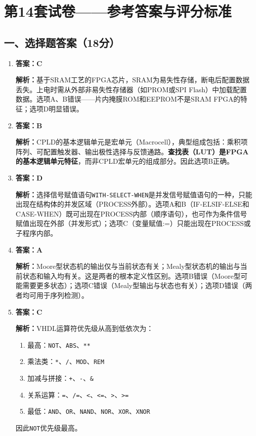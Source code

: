 \chapter{第14套试卷——参考答案与评分标准}

\section{一、选择题答案（18分）}

\begin{enumerate}[label=\arabic*.]

\item \textbf{答案：C}

\textbf{解析：}基于SRAM工艺的FPGA芯片，SRAM为易失性存储，断电后配置数据丢失。上电时需从外部非易失性存储器（如PROM或SPI Flash）中加载配置数据。选项A、B错误——片内掩膜ROM和EEPROM不是SRAM FPGA的特征；选项D明显错误。

\item \textbf{答案：B}

\textbf{解析：}CPLD的基本逻辑单元是宏单元（Macrocell），典型组成包括：乘积项阵列、可配置触发器、输出极性选择与反馈通路。\textbf{查找表（LUT）是FPGA的基本逻辑单元特征}，而非CPLD宏单元的组成部分。因此选项B正确。

\item \textbf{答案：D}

\textbf{解析：}选择信号赋值语句\texttt{WITH-SELECT-WHEN}是并发信号赋值语句的一种，只能出现在结构体的并发区域（PROCESS外部）。选项A和B（IF-ELSIF-ELSE和CASE-WHEN）既可出现在PROCESS内部（顺序语句），也可作为条件信号赋值出现在外部（并发形式）；选项C（变量赋值:=）只能出现在PROCESS或子程序内部。

\item \textbf{答案：A}

\textbf{解析：}Moore型状态机的输出仅与当前状态有关；Mealy型状态机的输出与当前状态和输入均有关。这是两者的根本定义性区别。选项B错误（Moore型可能需要更多状态）；选项C错误（Mealy型输出与状态也有关）；选项D错误（两者均可用于序列检测）。

\item \textbf{答案：C}

\textbf{解析：}VHDL运算符优先级从高到低依次为：
\begin{enumerate}
\item 最高：\texttt{NOT}、\texttt{ABS}、\texttt{**}
\item 乘法类：\texttt{*}、\texttt{/}、\texttt{MOD}、\texttt{REM}
\item 加减与拼接：\texttt{+}、\texttt{-}、\texttt{\&}
\item 关系运算：\texttt{=}、\texttt{/=}、\texttt{<}、\texttt{<=}、\texttt{>}、\texttt{>=}
\item 最低：\texttt{AND}、\texttt{OR}、\texttt{NAND}、\texttt{NOR}、\texttt{XOR}、\texttt{XNOR}
\end{enumerate}
因此\texttt{NOT}优先级最高。


\end{enumerate}
